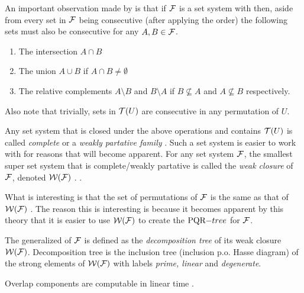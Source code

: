 An important observation made by \cite{mm96} is that if ${\cal F}$ is a set
system with \COP then, aside from every set in ${\cal F}$ being consecutive
(after applying the \COP order) the following sets must also be
consecutive for any $A, B \in {\cal F}$.
\begin{enumerate}
  \item The intersection $A \cap B$ 
  \item The union $A \cup B$ if $A \cap B \ne \emptyset$
  \item The relative complements $A \setminus B$ and $B \setminus A$
    if $B \nsubseteq A$ and $A \nsubseteq B$ respectively.
\end{enumerate}
Also note that trivially, sets in ${\cal T}(U)$ are consecutive in any
permutation of $U$.

Any set system that is closed under the above operations and contains
${\cal T}(U)$ is called {\em complete} \cite{mm96} or a {\em weakly partative
  family} \cite{mcc04}. Such a set system is easier to
work with for reasons that will become apparent.
For any set system ${\cal F}$, the smallest super set system that is
complete/weakly partative is called the {\em weak closure} of ${\cal F}$,
denoted ${\cal W}({\cal F})$ \cite[Def.~3.2]{mcc04}. \cite[Def.~2, smallest {\em
  complete} supercollection]{mm96}.

What is interesting is that the set of \COP permutations of ${\cal F}$ is
the same as that of ${\cal W}({\cal F})$ \cite[Th.~3]{mm96}. The reason this is
interesting is because it becomes apparent by this theory that it is
easier to use ${\cal W}({\cal F})$ to create the $\PQRtree$ for ${\cal F}$.


The generalized \PQtree of ${\cal F}$ is defined as the {\em decomposition
  tree} of its weak closure ${\cal W}({\cal F})$. Decomposition tree is the
inclusion tree (inclusion p.o. Hasse diagram) of the strong elements
of ${\cal W}({\cal F})$ with labels {\em prime, linear} and {\em degenerate}.\cite{mcc04}



Overlap components are computable in linear time \cite{mm95,wlh92}.


